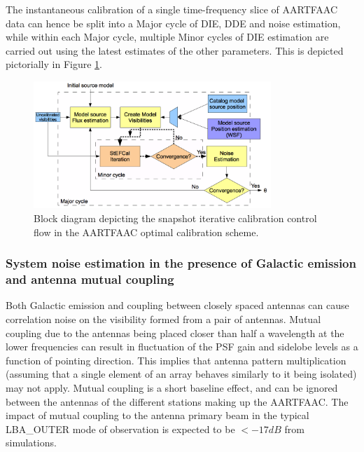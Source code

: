 \documentclass{aa}
\begin{document}
The instantaneous calibration of a  single time-frequency slice of AARTFAAC data
can hence be  split into a Major  cycle of DIE, DDE and  noise estimation, while
within each Major cycle, multiple Minor cycles of DIE estimation are carried out
using the latest estimates of the other parameters. This is depicted pictorially
in Figure \ref{fig:Block-diagram-depicting}.

\begin{figure}[tbh]
\centering
\includegraphics[width=0.8\textwidth]{Figs/Fig2_blkdiag}\caption{\label{fig:Block-diagram-depicting}Block diagram depicting the snapshot
iterative calibration control flow in the AARTFAAC optimal calibration
scheme. }
\end{figure}

\subsubsection{\label{sub:System-noise-estimation}System noise estimation in the
presence of Galactic emission and antenna mutual coupling}

Both Galactic  emission and coupling  between closely spaced antennas  can cause
correlation  noise on  the visibility  formed from  a pair  of  antennas. Mutual
coupling due to  the antennas being placed closer than half  a wavelength at the
lower frequencies can result in fluctuation  of the PSF gain and sidelobe levels
as a function of pointing direction\citep{agrawal1972mutual}.  This implies that
antenna  pattern multiplication  (assuming that  a  single element  of an  array
behaves similarly  to it  being isolated)  may not apply.  Mutual coupling  is a
short baseline effect, and can be  ignored between the antennas of the different
stations making  up the AARTFAAC. The  impact of mutual coupling  to the antenna
primary beam  in the typical  LBA\_OUTER mode of  observation is expected  to be
$<-17dB$ from simulations\citep{wijnholds2011situ}.
\end{document}
